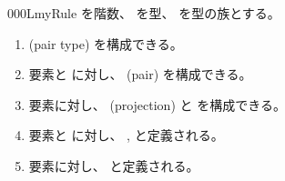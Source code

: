 \documentclass[index]{subfiles}
\begin{document}
\begin{myBlock}{000L}{myRule}
  を階数、
  を型、
  を型の族とする。
  \begin{enumerate}
  \item {}(pair type)
    を構成できる。
  \item 要素と
    に対し、
    (pair)
    を構成できる。
  \item 要素に対し、
    (projection)
    と
    を構成できる。
  \item 要素と
    に対し、
    ,
    と定義される。
  \item 要素に対し、
    と定義される。
  \end{enumerate}
\end{myBlock}
\end{document}
